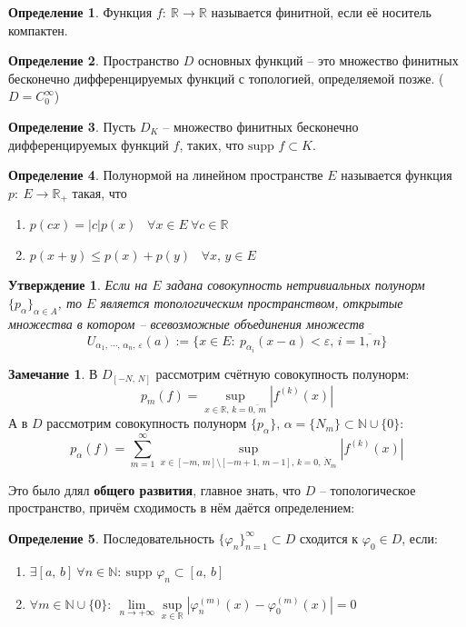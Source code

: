 \documentclass[a4paper,12pt]{article}
\renewcommand{\phi}{\ensuremath{\varphi}}
\renewcommand{\leq}{\ensuremath{\leqslant}}
\theoremstyle{plain}
\newtheorem{proposition}{Утверждение}[section]
\theoremstyle{definition}
\newtheorem{definition}{Определение}[section]
\newtheorem*{note}{Замечание}
\theoremstyle{remark}
\begin{document}
\begin{definition}
	Функция $f:\: \mathbb{R} \to \mathbb{R}$ называется финитной, если её носитель компактен.
\end{definition}

\begin{definition}
	Пространство $D$ основных функций -- это множество финитных бесконечно дифференцируемых функций с топологией, определяемой позже. ($D = C_0^\infty$)
\end{definition}

\begin{definition}
	Пусть $D_K$ -- множество финитных бесконечно дифференцируемых функций $f$, таких, что $\text{supp }f \subset K$.
\end{definition}

\begin{definition}
	Полунормой на линейном пространстве $E$ называется функция $p:\: E \to \mathbb{R}_+$ такая, что
	\begin{enumerate}
		\item $p(cx) = |c|p(x)\;\;\; \forall x \in E \: \forall c \in \mathbb{R}$
		\item $p(x + y) \leq p(x) + p(y)\;\;\; \forall x,\, y \in E$
	\end{enumerate}
\end{definition}

\begin{proposition}
	Если на $E$ задана совокупность нетривиальных полунорм $\{p_\alpha\}_{\alpha \in A}$, то $E$ является топологическим пространством, открытые множества в котором -- всевозможные объединения множеств
	\[U_{\alpha_1,\,\cdots,\,\alpha_n,\, \varepsilon}(a) := \{x \in E:\: p_{\alpha_i}(x - a) < \varepsilon,\, i = \overline{1,\,n}\}\]
\end{proposition}

\begin{note}
	В $D_{[-N,\,N]}$ рассмотрим счётную совокупность полунорм:
	\[p_m(f) = \sup_{x \in \mathbb{R},\, k = \overline{0,\,m}}|f^{(k)}(x)|\]
	А в $D$ рассмотрим совокупность полунорм $\{p_\alpha\},\, \alpha = \{N_m\}\subset \mathbb{N} \cup \{0\}$:
	\[p_\alpha(f) = \sum_{m = 1}^\infty \sup_{x \in [-m,\,m]\setminus[-m + 1,\, m - 1],\, k =\overline{0,\, N_m}} |f^{(k)}(x)|\]
\end{note}

Это было длял \textbf{общего развития}, главное знать, что $D$ -- топологическое пространство, причём сходимость в нём даётся определением:
\begin{definition}
	Последовательность $\{\phi_n\}_{n = 1}^\infty \subset D$ сходится к $\phi_0 \in D$, если:
	\begin{enumerate}
		\item $\exists [a,\,b] \: \forall n \in \mathbb{N}:\: \text{supp }\phi_n \subset [a,\,b]$
		\item $\forall m \in \mathbb{N} \cup \{0\}:\: \lim\limits_{n \to +\infty} \sup\limits_{x \in \mathbb{R}}|\phi_n^{(m)}(x) - \phi_0^{(m)}(x)| = 0$
	\end{enumerate}
\end{definition}
\end{document}
